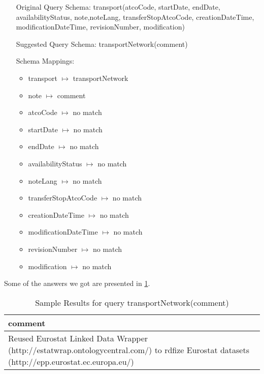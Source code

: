 \documentclass[a4paper,10pt]{article}
\begin{document}
		
\begin{itemize}
\item[Original Query Schema:] transport(atcoCode, startDate, endDate, availabilityStatus, note,noteLang, 
transferStopAtcoCode, creationDateTime, modificationDateTime, revisionNumber, modification)
\item[Suggested Query Schema: ]
transportNetwork(comment)
\item[Schema Mappings:] 
		\begin{itemize}
		\item transport $\mapsto$ transportNetwork
\item note $\mapsto$ comment
\item atcoCode $\mapsto$ no match
\item startDate $\mapsto$ no match
\item endDate $\mapsto$ no match
\item availabilityStatus $\mapsto$ no match
\item noteLang $\mapsto$ no match
\item transferStopAtcoCode $\mapsto$ no match
\item creationDateTime $\mapsto$ no match
\item modificationDateTime $\mapsto$ no match
\item revisionNumber $\mapsto$ no match
\item modification $\mapsto$ no match


\end{itemize}
		\end{itemize}
		
		Some of the answers we got are presented in  \ref{transportNetwork(comment)}.			
		
\begin{table}

\caption{Sample Results for query transportNetwork(comment)}
\begin{center}
\begin{tabular}{l }
\hline
comment \\ \hline
Reused Eurostat Linked Data Wrapper (http://estatwrap.ontologycentral.com/) to rdfize Eurostat datasets (http://epp.eurostat.ec.europa.eu/)

\end{tabular}
\label{transportNetwork(comment)}
\end{center}
\end{table}	
	
		
		
		
		
		
		
		
		
		
		
		
		
		
		
		





\end{document}

